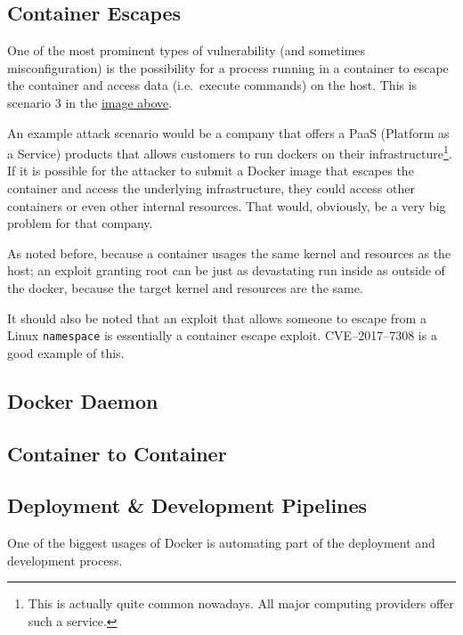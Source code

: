 \subsection{Container Escapes}
One of the most prominent types of vulnerability (and sometimes misconfiguration) is the possibility for a process running in a container to escape the container and access data (i.e.\ execute commands) on the host. This is scenario 3 in the \href{fig:attacksurfaces}{image above}.

\hfill

An example attack scenario would be a company that offers a PaaS (Platform as a Service) products that allows customers to run dockers on their infrastructure\footnote{This is actually quite common nowadays. All major computing providers offer such a service.}. If it is possible for the attacker to submit a Docker image that escapes the container and access the underlying infrastructure, they could access other containers or even other internal resources. That would, obviously, be a very big problem for that company.

\hfill

As noted before, because a container usages the same kernel and resources as the host; an exploit granting root can be just as devastating run inside as outside of the docker, because the target kernel and resources are the same.

It should also be noted that an exploit that allows someone to escape from a Linux \lstinline{namespace} is essentially a container escape exploit. CVE--2017--7308\cite{cve20177308} is a good example of this.

\subsection{Docker Daemon}

\subsection{Container to Container}

\subsection{Deployment \& Development Pipelines}
One of the biggest usages of Docker is automating part of the deployment and development process.


